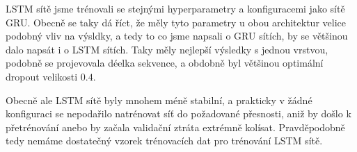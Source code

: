 LSTM sítě jsme trénovali se stejnými hyperparametry a konfiguracemi jako sítě
GRU. Obecně se taky dá říct, že měly tyto parametry u obou architektur velice
podobný vliv na výsldky, a tedy to co jsme napsali o GRU sítích, by se většinou
dalo napsát i o LSTM sítích. Taky měly nejlepší výsledky s jednou vrstvou,
podobně se projevovala déelka sekvence, a obdobně byl většinou optimální
dropout velikosti $0.4$.

Obecně ale LSTM sítě byly mnohem méně stabilní, a prakticky v žádné konfiguraci
se nepodařilo natrénovat síť do požadované přesnosti, aniž by došlo k
přetrénování anebo by začala validační ztráta extrémně kolísat. Pravděpodobně
tedy nemáme dostatečný vzorek trénovacích dat pro trénování LSTM sítě.


%
%
%
%
%
%
%
%
%
%
%
%
%
%
%
%



